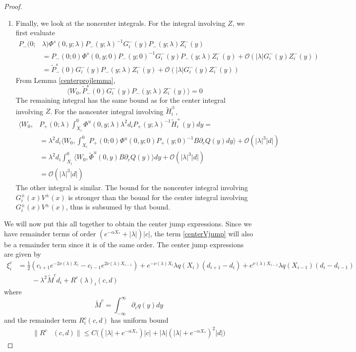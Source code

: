 \documentclass[thesis.tex]{subfiles}
\begin{document}
\begin{lemma}
\begin{proof}
\begin{enumerate}
\item Finally, we look at the noncenter integrals. For the integral involving $Z$, we first evaluate 
\begin{align*}
P_-(0; &\lambda) \Phi^s(0, y; \lambda) P_-(y; \lambda)^{-1} G_i^-(y) P_-(y; \lambda)Z_i^-(y) \\
&= P_-(0; 0) \Phi^s(0, y; 0) P_-(y; 0)^{-1}G_i^-(y) P_-(y; \lambda)Z_i^-(y) + \mathcal{O}(|\lambda| G_i^-(y) Z_i^-(y)) \\
&= \tilde{P}_-^s(0)G_i^-(y) P_-(y; \lambda)Z_i^-(y) + \mathcal{O}(|\lambda| G_i^-(y) Z_i^-(y))
\end{align*}
From Lemma \ref{centerprojlemma},
\[
\langle W_0, \tilde{P}_-^s(0)G_i^-(y) P_-(y; \lambda)Z_i^-(y) \rangle = 0
\]
The remaining integral has the same bound as for the center integral involving $Z$. For the noncenter integral involving $\tilde{H}_i^\pm$, 
\begin{align*}
\langle W_0, 
&P_+(0; \lambda) \int_{X_i}^0 \Phi^u(0, y; \lambda) \lambda^2 d_i P_+(y; \lambda)^{-1} \tilde{H}_i^+(y) dy 
= \\
&= \lambda^2 d_i \langle W_0, \int_{X_i}^0 P_+(0; 0) \Phi^u(0, y; 0) P_+(y; 0)^{-1} B \partial_c Q(y) dy \rangle + \mathcal{O}(|\lambda|^3 |d| ) \\
&= \lambda^2 d_i \int_{X_i}^0 \langle W_0, \tilde{\Phi}^u(0, y)  B \partial_c Q(y) \rangle dy + \mathcal{O}(|\lambda|^3 |d| ) \\
&= \mathcal{O}(|\lambda|^3 |d| ) 
\end{align*}
The other integral is similar. The bound for the noncenter integral involving $G_i^\pm(x) V^\pm(x)$ is stronger than the bound for the center integral involving $G_i^\pm(x) V^\pm(x)$, thus is subsumed by that bound.
\end{enumerate}

We will now put this all together to obtain the center jump expressions. Since we have remainder terms of order $(e^{-\alpha X_*} + |\lambda|)|c|$, the term \cref{centerVjump} will also be a remainder term since it is of the same order. The center jump expressions are given by
\begin{align*}
\xi^c_i &= \frac{1}{2} \left( c_{i+1} e^{-2 \nu(\lambda)X_i} - c_{i-1} e^{2 \nu(\lambda)X_{i-1}} \right) + e^{-\nu(\lambda)X_i} \lambda q(X_i) (d_{i+1} - d_i )  + e^{\nu(\lambda)X_{i-1}} \lambda q(X_{i-1}) (d_i - d_{i-1} ) \\
&\qquad - \lambda^2 \tilde{M}^c d_i + R^c(\lambda)_i(c, d)
\end{align*}
where
\[
\tilde{M}^c = \int_{-\infty}^\infty \partial_c q(y) dy
\]
and the remainder term $R^c_i(c, d)$ has uniform bound
\begin{equation}\label{centerR}
\begin{aligned}
\|R^c&(c, d)\| \leq C \Big( (|\lambda| + e^{-\alpha X_*})|c| + |\lambda| (|\lambda| + e^{-\alpha X_*})^2 |d| \Big)
\end{aligned}
\end{equation}


\end{proof}
\end{lemma}
\end{document}
